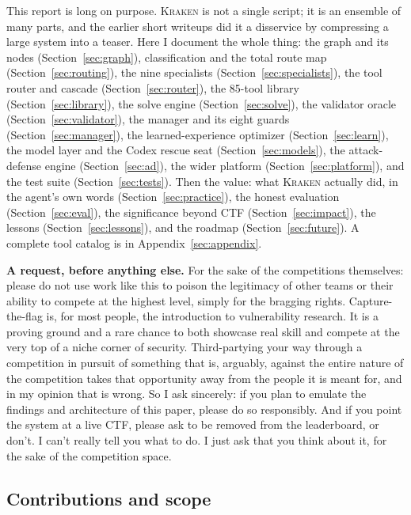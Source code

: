 \documentclass[10pt,twocolumn]{article}
\newcommand{\kraken}{\textsc{Kraken}}
\begin{document}
This report is long on purpose. \kraken{} is not a single script; it is an ensemble of many parts, and
the earlier short writeups did it a disservice by compressing a large system into a teaser. Here I document the
whole thing: the graph and its nodes (Section~\ref{sec:graph}), classification and the total route
map (Section~\ref{sec:routing}), the nine specialists (Section~\ref{sec:specialists}), the tool
router and cascade (Section~\ref{sec:router}), the 85-tool library (Section~\ref{sec:library}), the
solve engine (Section~\ref{sec:solve}), the validator oracle (Section~\ref{sec:validator}), the
manager and its eight guards (Section~\ref{sec:manager}), the learned-experience optimizer
(Section~\ref{sec:learn}), the model layer and the Codex rescue seat (Section~\ref{sec:models}), the
attack-defense engine (Section~\ref{sec:ad}), the wider platform (Section~\ref{sec:platform}), and
the test suite (Section~\ref{sec:tests}). Then the value: what \kraken{} actually did, in the agent's
own words (Section~\ref{sec:practice}), the honest evaluation (Section~\ref{sec:eval}), the
significance beyond CTF (Section~\ref{sec:impact}), the lessons (Section~\ref{sec:lessons}), and the
roadmap (Section~\ref{sec:future}). A complete tool catalog is in Appendix~\ref{sec:appendix}.

\medskip
\textbf{A request, before anything else.} For the sake of the competitions themselves: please do not use
work like this to poison the legitimacy of other teams or their ability to compete at the highest level,
simply for the bragging rights. Capture-the-flag is, for most people, the
introduction to vulnerability research. It is a proving ground and a rare chance to both showcase real
skill and compete at the very top of a niche corner of security. Third-partying your way through a
competition in pursuit of something that is, arguably, against the entire nature of the competition takes
that opportunity away from the people it is meant for, and in my opinion that is wrong. So I ask sincerely:
if you plan to emulate the findings and architecture of this paper, please do so responsibly. And if you
point the system at a live CTF, please ask to be removed from the leaderboard, or don't. I can't really tell
you what to do. I just ask that you think about it, for the sake of the competition space.

\subsection*{Contributions and scope}
\end{document}
